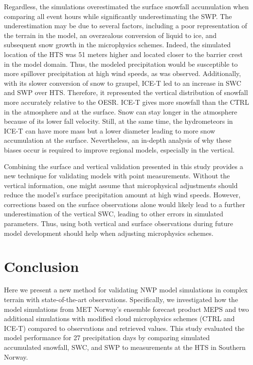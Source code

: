\documentclass{ametsocV5}
\begin{document}
		Regardless, the simulations overestimated the surface snowfall accumulation when comparing all event hours while significantly underestimating the SWP. The underestimation may be due to several factors, including a poor representation of the terrain in the model, an overzealous conversion of liquid to ice, and subsequent snow growth in the microphysics schemes. Indeed, the simulated location of the HTS was 51 meters higher and located closer to the barrier crest in the model domain. Thus, the modeled precipitation would be susceptible to more spillover precipitation at high wind speeds, as was observed. Additionally, with its slower conversion of snow to graupel, ICE-T led to an increase in SWC and SWP over HTS. Therefore, it represented the vertical distribution of snowfall more accurately relative to the OESR. ICE-T gives more snowfall than the CTRL in the atmosphere and at the surface. Snow can stay longer in the atmosphere because of its lower fall velocity. Still, at the same time, the hydrometeors in ICE-T can have more mass but a lower diameter leading to more snow accumulation at the surface.  Nevertheless, an in-depth analysis of why these biases occur is required to improve regional models, especially in the vertical.

		Combining the surface and vertical validation presented in this study provides a new technique for validating models with point measurements. Without the vertical information, one might assume that microphysical adjustments should reduce the model's surface precipitation amount at high wind speeds. However, corrections based on the surface observations alone would likely lead to a further underestimation of the vertical SWC, leading to other errors in simulated parameters. Thus, using both vertical and surface observations during future model development should help when adjusting microphysics schemes. 
		


\section{Conclusion}\label{sec:conclusion}
	Here we present a new method for validating NWP model simulations in complex terrain with state-of-the-art observations. Specifically, we investigated how the model simulations from MET Norway's ensemble forecast product MEPS and two additional simulations with modified cloud microphysics schemes (CTRL and ICE-T) compared to observations and retrieved values. This study evaluated the model performance for 27 precipitation days by comparing simulated accumulated snowfall, SWC, and SWP to measurements at the HTS in Southern Norway. 
\end{document}
